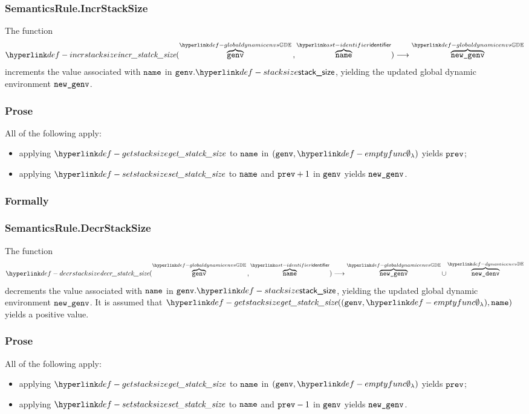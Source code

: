\subsubsection{SemanticsRule.IncrStackSize\label{sec:SemanticsRule.IncrStackSize}}
\hypertarget{def-incrstacksize}{}
The function
\[
\incrstacksize(\overname{\genv}{\globaldynamicenvs} \aslsep \overname{\name}{\identifier}) \aslto
\overname{\newgenv}{\globaldynamicenvs}
\]
increments the value associated with $\name$ in $\genv.\stacksize$, yielding the updated global dynamic environment $\newgenv$.

\subsubsection{Prose}
All of the following apply:
\begin{itemize}
  \item applying $\getstacksize$ to $\name$ in $(\genv, \emptyfunc)$ yields $\vprev$;
  \item applying $\setstacksize$ to $\name$ and $\vprev + 1$ in $\genv$ yields $\newgenv$.
\end{itemize}

\subsubsection{Formally}
\begin{mathpar}
\end{mathpar}

\subsubsection{SemanticsRule.DecrStackSize\label{sec:SemanticsRule.DecrStackSize}}
\hypertarget{def-decrstacksize}{}
The function
\[
\decrstacksize(\overname{\genv}{\globaldynamicenvs} \aslsep \overname{\name}{\identifier}) \aslto
\overname{\newgenv}{\globaldynamicenvs} \cup \overname{\newdenv}{\dynamicenvs}
\]
decrements the value associated with $\name$ in $\genv.\stacksize$, yielding the updated global dynamic environment $\newgenv$.
It is assumed that $\getstacksize((\genv, \emptyfunc), \name)$ yields a positive value.

\subsubsection{Prose}
All of the following apply:
\begin{itemize}
  \item applying $\getstacksize$ to $\name$ in $(\genv, \emptyfunc)$ yields $\vprev$;
  \item applying $\setstacksize$ to $\name$ and $\vprev - 1$ in $\genv$ yields $\newgenv$.
\end{itemize}

